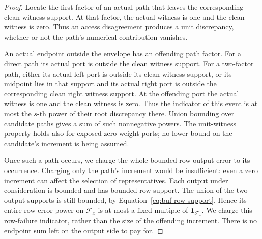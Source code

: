 \begin{proof}
Locate the first factor of an actual path that leaves the corresponding clean witness support. At that factor, the actual witness is one and the clean witness is zero. Thus an access disagreement produces a unit discrepancy, whether or not the path's numerical contribution vanishes.

An actual endpoint outside the envelope has an offending path factor.
For a direct path its actual port is outside the clean witness support.
For a two-factor path, either its actual left port is outside its clean
witness support, or its midpoint lies in that support and its actual
right port is outside the corresponding clean right witness support.
At the offending port the actual witness is one and the clean witness
is zero.  Thus the indicator of this event is at most the $s$-th power
of their root discrepancy there.  Union bounding over candidate paths
gives a sum of such nonnegative powers.  The unit-witness property holds
also for exposed zero-weight ports; no lower bound on the candidate's
increment is being assumed.

Once such a path occurs, we charge the whole bounded row-output error to its occurrence. Charging only the path's increment would be insufficient: even a zero increment can affect the selection of representatives. Each output under consideration is bounded and has bounded row support.
The union of the two output supports is still bounded, by
Equation~\eqref{eq:buf-row-support}.  Hence its entire row error power on
$\mathcal F_x$ is at most a fixed multiple of
$\mathbf1_{\mathcal F_x}$.  We charge this row-failure indicator, rather
than the size of the offending increment.  There is no endpoint sum left
on the output side to pay for.


\end{proof}
